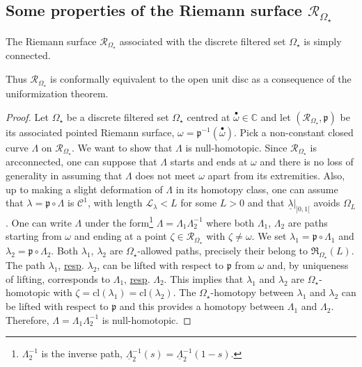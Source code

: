 \documentclass[11pt, english]{smfart}
\theoremstyle{definition}
\begin{document}
\subsection{Some properties of the Riemann surface
  $\mathscr{R}_{\Omega_\star}$}

\begin{prop}\label{PropdefbasicbisB}
The Riemann surface $\mathscr{R}_{\Omega_\star}$ associated with the
discrete filtered set $\Omega_\star$  is simply connected.
\end{prop}

Thus $\mathscr{R}_{\Omega_\star}$ is conformally equivalent to the
open unit disc as a consequence of the uniformization theorem.

\begin{proof}
Let $\Omega_\star$ be a  discrete filtered set $\Omega_\star$ centred
at ${ {\stackrel{\bullet}{\omega}} } \in \mathbb{C}$ and  let $(\mathscr{R}_{\Omega_\star}, \mathfrak{p})$ 
be its associated pointed  Riemann surface, $\omega =
\mathfrak{p}^{-1}({ {\stackrel{\bullet}{\omega}} })$. 
Pick a non-constant
closed curve $\Lambda$ on $\mathscr{R}_{\Omega_\star}$. We want to show that 
$\Lambda$ is null-homotopic. Since $\mathscr{R}_{\Omega_\star}$ is
arcconnected, one can suppose that $\Lambda$ starts and ends at
$\omega$  and  there is no loss of generality in assuming that
$\Lambda$ does not meet $\omega$ apart from its extremities. Also, up to making
a slight deformation of $\Lambda$ in its homotopy class, one can
assume that $\lambda =  \mathfrak{p} \circ \Lambda$ is
$\mathcal{C}^1$, with length $\mathcal{L}_\lambda <L$ for some $L>0$
and that $\underline{\lambda}|_{]0,1[}$ avoids $\Omega_L$.
One can write $\Lambda$ under the
form\footnote{$\Lambda_2^{-1}$ is the inverse path,
  $\underline{\Lambda}_2^{-1}(s) = \underline{\Lambda}_2^{-1}(1-s)$.}
$\Lambda = \Lambda_1 \Lambda_2^{-1}$ where both $\Lambda_1$,
$\Lambda_2$ are paths starting from $\omega$ and ending at a point 
$\zeta \in \mathscr{R}_{\Omega_\star}$ with $\zeta \neq \omega$. 
We set $\lambda_1 =  \mathfrak{p} \circ \Lambda_1$ and 
$\lambda_2 =  \mathfrak{p} \circ \Lambda_2$. Both $\lambda_1$,
$\lambda_2$ are  $\Omega_\star$-allowed paths, precisely their belong
to $\mathfrak{R}_{\Omega_\star}(L)$. The path  $\lambda_1$, \underline{resp}. 
$\lambda_2$, can be lifted with respect to  $\mathfrak{p}$ from 
$\omega$ and, by uniqueness of lifting, corresponds to $\Lambda_1$, \underline{resp}. 
$\Lambda_2$. This implies that $\lambda_1$ and $\lambda_2$ are 
$\Omega_\star$-homotopic with $\zeta = \mathrm{cl}(\lambda_1) =
\mathrm{cl}(\lambda_2)$. The $\Omega_\star$-homotopy between
$\lambda_1$ and $\lambda_2$ can be lifted with respect to
$\mathfrak{p}$ and this provides a homotopy between $\Lambda_1$ and 
$\Lambda_2$. Therefore, $\Lambda = \Lambda_1 \Lambda_2^{-1}$ is null-homotopic.
\end{proof}
\end{document}
